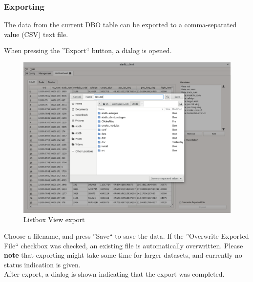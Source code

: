 \documentclass[10pt,letterpaper,extrafontsizes]{memoir}
\begin{document}
\subsubsection{Exporting}

The data from the current DBO table can be exported to a comma-separated value (CSV) text file. 

When pressing the ''Export`` button, a dialog is opened.

\begin{figure}[H]
    \hspace*{-2cm}
    \includegraphics[width=18cm]{../screenshots/listbox_export.png}
  \caption{Listbox View export}
  \label{fig:listbox_export}
\end{figure}

Choose a filename, and press ''Save`` to save the data. If the ''Overwrite Exported File`` checkbox was checked, an existing file is automatically overwritten. Please \textbf{note} that exporting might take some time for larger datasets, and currently no status indication is given.\\
After export, a dialog is shown indicating that the export was completed.
\end{document}
